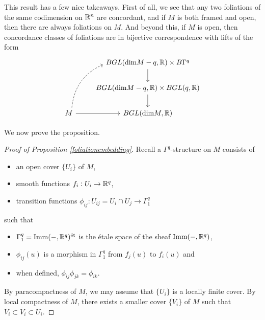 \documentclass{article}
\newtheorem{proposed work}[theorem]{Proposed Work}
\theoremstyle{definition}
\DeclareMathOperator{\Imm}{Imm}
\begin{document}
This result has a few nice takeaways. First of all, we see that any two foliations of the same codimension on $\mathbb R^n$ are concordant, and if $M$ is both framed and open, then there are always foliations on $M$. And beyond this, if $M$ is open, then concordance classes of foliations are in bijective correspondence with lifts of the form
\[
\begin{tikzcd}
{} & BGL(\text{dim} M -q,\R) \times B\Gamma^q \ar[d] \\
{} & BGL(\text{dim} M -q, \R) \times BGL(q, \R) \ar[d] \\
M \ar[uur, dashed, bend left] \ar[r] & BGL(\text{dim} M, \R)
\end{tikzcd}
\]

We now prove the proposition. 

\begin{proof}[Proof of Proposition \ref{foliationembedding}]
Recall a $\Gamma^q$-structure on $M$ consists of
\begin{itemize}
\item an open cover $\{ U_i\}$ of $M$,
\item smooth functions $f_i: U_i \to \mathbb R^q$,
\item transition functions $\phi_{ij}: U_{ij} = U_i \cap U_j \to \Gamma^q_1$
\end{itemize}
such that
\begin{itemize}
\item $\Gamma^q_1 = \Imm(-,\R^q)^{\text{\'et}}$ is the \'etale space of the
sheaf $\Imm(-,\R^q)$,
\item $\phi_{ij}(u)$ is a morphism in $\Gamma^q_1$ from $f_j(u)$ to
$f_i(u)$ and
\item when defined, $\phi_{ij}\phi_{jk} = \phi_{ik}$.
\end{itemize}

By paracompactness of $M$, we may assume that $\{U_i\}$ is a locally
finite cover. By local compactness of $M$, there exists a smaller
cover $\{V_i\}$ of $M$ such that $V_i \subset \bar{V}_i \subset U_i$.


\end{proof}
\end{document}
